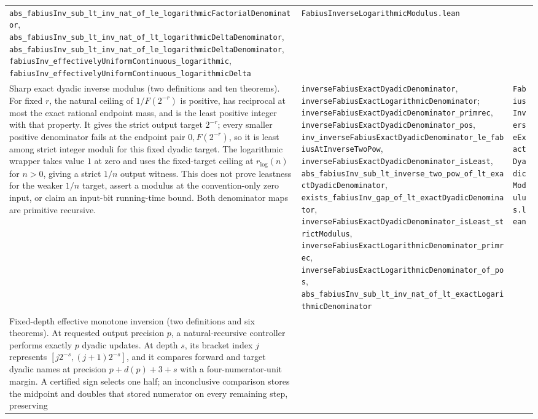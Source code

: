 \documentclass[11pt,oneside]{article}
\theoremstyle{definition}
\theoremstyle{remark}
\begin{document}
\begin{longtable}{@{}p{}p{}p{}@{}}
\nolinkurl{abs_fabiusInv_sub_lt_inv_nat_of_le_logarithmicFactorialDenominator},
\nolinkurl{abs_fabiusInv_sub_lt_inv_nat_of_lt_logarithmicDeltaDenominator},
\nolinkurl{abs_fabiusInv_sub_lt_inv_nat_of_le_logarithmicDeltaDenominator},
\nolinkurl{fabiusInv_effectivelyUniformContinuous_logarithmic},
\nolinkurl{fabiusInv_effectivelyUniformContinuous_logarithmicDelta} &
\nolinkurl{FabiusInverseLogarithmicModulus.lean} \\
Sharp exact dyadic inverse modulus (two definitions and ten theorems).
For fixed \(r\), the natural ceiling of \(1/F(2^{-r})\) is positive, has
reciprocal at most the exact rational endpoint mass, and is the least positive
integer with that property.  It gives the strict output target \(2^{-r}\);
every smaller positive denominator fails at the endpoint pair
\(0,F(2^{-r})\), so it is least among strict integer moduli for this fixed
dyadic target.  The logarithmic wrapper takes value \(1\) at zero and uses the
fixed-target ceiling at \(r_{\log}(n)\) for \(n>0\), giving a strict \(1/n\)
output witness.  This does not prove leastness for the weaker \(1/n\) target,
assert a modulus at the convention-only zero input, or claim an input-bit
running-time bound.  Both denominator maps are primitive recursive. &
\nolinkurl{inverseFabiusExactDyadicDenominator},
\nolinkurl{inverseFabiusExactLogarithmicDenominator};
\nolinkurl{inverseFabiusExactDyadicDenominator_primrec},
\nolinkurl{inverseFabiusExactDyadicDenominator_pos},
\nolinkurl{inv_inverseFabiusExactDyadicDenominator_le_fabiusAtInverseTwoPow},
\nolinkurl{inverseFabiusExactDyadicDenominator_isLeast},
\nolinkurl{abs_fabiusInv_sub_lt_inverse_two_pow_of_lt_exactDyadicDenominator},
\nolinkurl{exists_fabiusInv_gap_of_lt_exactDyadicDenominator},
\nolinkurl{inverseFabiusExactDyadicDenominator_isLeast_strictModulus},
\nolinkurl{inverseFabiusExactLogarithmicDenominator_primrec},
\nolinkurl{inverseFabiusExactLogarithmicDenominator_of_pos},
\nolinkurl{abs_fabiusInv_sub_lt_inv_nat_of_lt_exactLogarithmicDenominator} &
\nolinkurl{FabiusInverseExactDyadicModulus.lean} \\
Fixed-depth effective monotone inversion (two definitions and six theorems).
At requested output precision \(p\), a natural-recursive controller performs
exactly \(p\) dyadic updates.  At depth \(s\), its bracket index \(j\)
represents \([j2^{-s},(j+1)2^{-s}]\), and it compares forward and target
dyadic names at precision \(p+d(p)+3+s\) with a four-numerator-unit margin.
A certified sign selects one half; an inconclusive comparison stores the
midpoint and doubles that stored numerator on every remaining step, preserving

\end{longtable}
\end{document}
